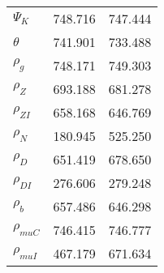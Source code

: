 \begin{center}
\begin{longtable}{lcc}
$ {\Psi_{K}}           $	 & 	     748.716	 & 	     747.444 \\ 
$ {\theta}             $	 & 	     741.901	 & 	     733.488 \\ 
$ {\rho_g}             $	 & 	     748.171	 & 	     749.303 \\ 
$ {\rho_Z}             $	 & 	     693.188	 & 	     681.278 \\ 
$ {\rho_{ZI}}          $	 & 	     658.168	 & 	     646.769 \\ 
$ {\rho_N}             $	 & 	     180.945	 & 	     525.250 \\ 
$ {\rho_D}             $	 & 	     651.419	 & 	     678.650 \\ 
$ {\rho_{DI}}          $	 & 	     276.606	 & 	     279.248 \\ 
$ {\rho_b}             $	 & 	     657.486	 & 	     646.298 \\ 
$ {\rho_{muC}}         $	 & 	     746.415	 & 	     746.777 \\ 
$ {\rho_{muI}}         $	 & 	     467.179	 & 	     671.634 \\ 
\end{longtable}
 \end{center}
